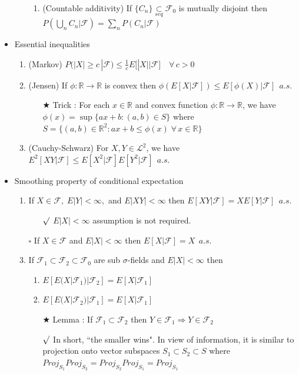 \documentclass[12pt, A4]{article}
\newcommand{\sq}{$\square$}
\newcommand{\rmk}{$\surd$}
\newcommand{\trick}{$\bigstar$}
\newcommand{\R}{\mathbb{R}}
\newcommand{\F}{\mathcal{F}}
\newcommand{\LL}{\mathcal{L}}
\newcommand{\seq}{\underset{seq}{\subset}}
\begin{document}
\begin{itemize}
\begin{itemize}
\begin{enumerate}
			\item (Countable additivity) If $\{C_n\}\seq \F_0$ is mutually disjoint then $P(\bigcup_n C_n|\F)=\sum_n P(C_n|\F)$     
		\end{enumerate} 
	\end{itemize}
	\item Essential inequalities
	\begin{enumerate}
		\item (Markov) \; $P(|X|\geq c\,  | \F)\leq \frac{1}{c}E\big[|X| \big| \F \big]\quad \forall \, c>0$
		\item (Jensen) \; If $\phi : \R\rightarrow \R$ is convex then $\phi(E[X|\F])\leq E[\phi(X)|\F]\;\, a.s.$
		\begin{itemize}
			\item[\trick] Trick : For each $x\in \R$ and convex function $\phi:\R\rightarrow \R$, we have \\ $\phi(x)=\sup\{ax+b : (a,b)\in S\}$ where $S=\{(a,b)\in \R^2 : ax+b\leq \phi(x)\;\forall\,x\in \R\}$ 
		\end{itemize}
		\item (Cauchy-Schwarz) For $X, Y\in \LL^2$, we have $E^2[XY|\F]\leq E[X^2|\F]E[Y^2|\F]\;\, a.s.$
	\end{enumerate}
	\item Smoothing property of conditional expectation
	\begin{enumerate}
		\item If $X\in \F, \; E|Y|<\infty, $ and $E|XY|<\infty$ then $E[XY|\F]=XE[Y|\F]\;\,a.s.$
		\begin{itemize}
			\item[\rmk] $E|X|<\infty$ assumption is not required.
		\end{itemize}
		\item[\sq] If $X\in \F$ and $E|X|<\infty$ then $E[X|\F]=X\;\,a.s.$ 
		\item If $\F_1\subset \F_2\subset \F_0$ are sub $\sigma$-fields and $E|X|<\infty$ then 
		\begin{enumerate}
			\item $E[E(X|\F_1)|\F_2]=E[X|\F_1]$
			\item $E[E(X|\F_2)|\F_1]=E[X|\F_1]$
		\end{enumerate}
		\begin{itemize}
			\item[\trick] Lemma :  If $\F_1\subset \F_2$ then $Y\in \F_1\Rightarrow Y\in \F_2$
			\item[\rmk] In short, ``the smaller wins". In view of information, it is similar to projection onto vector subspaces $S_1\subset S_2\subset S$ where $Proj_{S_1}Proj_{S_2}=Proj_{S_2}Proj_{S_1}=Proj_{S_1}$

\end{itemize}
\end{enumerate}
\end{itemize}
\end{document}
